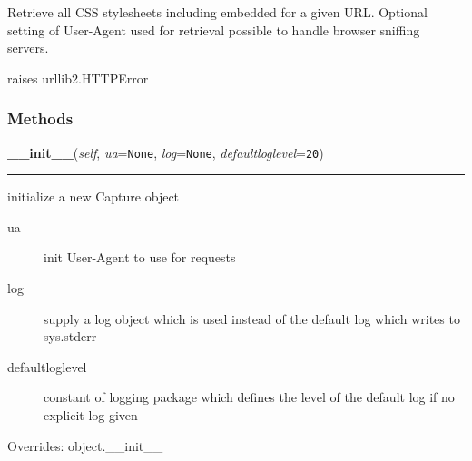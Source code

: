 Retrieve all CSS stylesheets including embedded for a given URL.
Optional setting of User-Agent used for retrieval possible
to handle browser sniffing servers.

raises urllib2.HTTPError


  \subsubsection{Methods}

    \vspace{0.5ex}

\hspace{.8\funcindent}\begin{boxedminipage}{\funcwidth}

    \raggedright \textbf{\_\_init\_\_}(\textit{self}, \textit{ua}={\tt None}, \textit{log}={\tt None}, \textit{defaultloglevel}={\tt 20})

    \vspace{-1.5ex}

    \rule{\textwidth}{0.5\fboxrule}
\setlength{\parskip}{2ex}

initialize a new Capture object
\begin{description}
\item[{ua}] \leavevmode 
init User-Agent to use for requests

\item[{log}] \leavevmode 
supply a log object which is used instead of the default
log which writes to sys.stderr

\item[{defaultloglevel}] \leavevmode 
constant of logging package which defines the level of the
default log if no explicit log given

\end{description}
\setlength{\parskip}{1ex}
      Overrides: object.\_\_init\_\_

    \end{boxedminipage}

    \label{cssutils:scripts:csscapture:CSSCapture:capture}

